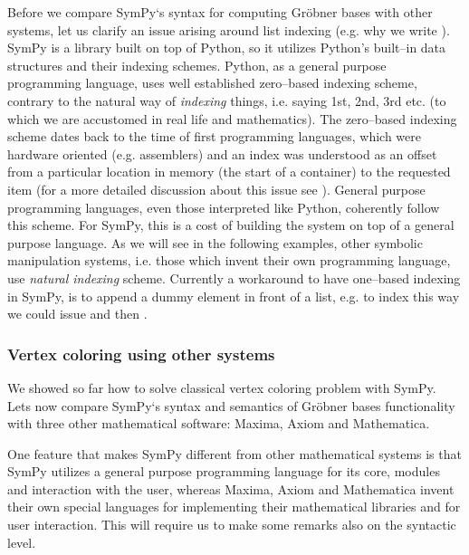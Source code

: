 Before we compare SymPy`s syntax for computing Gröbner bases with other systems, let us clarify an
issue arising around list indexing (e.g. why we write ). SymPy is a library built on top
of Python, so it utilizes Python's built--in data structures and their indexing schemes. Python, as a
general purpose programming language, uses well established zero--based indexing scheme, contrary to the
natural way of \emph{indexing} things, i.e. saying 1st, 2nd, 3rd etc. (to which we are accustomed in real life
and mathematics). The zero--based indexing scheme dates back to the time of first programming languages,
which were hardware oriented (e.g. assemblers) and an index was understood as an offset from a particular
location in memory (the start of a container) to the requested item (for a more detailed discussion about
this issue see \cite{Dijkstra1982zero}). General purpose programming languages, even those interpreted like
Python, coherently follow this scheme. For SymPy, this is a cost of building the system on top of a general
purpose language. As we will see in the following examples, other symbolic manipulation systems, i.e. those
which invent their own programming language, use \emph{natural indexing} scheme. Currently a workaround to have
one--based indexing in SymPy, is to append a dummy element in front of a list, e.g. to index  this
way we could issue  and then .


\subsubsection{Vertex coloring using other systems}

We showed so far how to solve classical vertex coloring problem with SymPy. Lets now compare SymPy`s
syntax and semantics of Gröbner bases functionality with three other mathematical software: Maxima,
Axiom and Mathematica.

One feature that makes SymPy different from other mathematical systems is that SymPy utilizes a general
purpose programming language for its core, modules and interaction with the user, whereas Maxima, Axiom
and Mathematica invent their own special languages for implementing their mathematical libraries and for
user interaction. This will require us to make some remarks also on the syntactic level.

